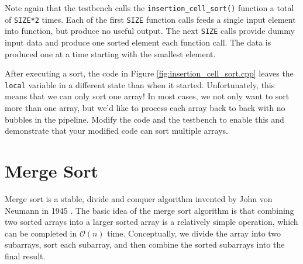 Note again that the testbench calls the \lstinline{insertion_cell_sort()} function a total of \lstinline{SIZE*2} times. Each of the first \lstinline{SIZE} function calls feeds a single input element into function, but produce no useful output. The next \lstinline{SIZE} calls provide dummy input data and produce one sorted element each function call.  The data is produced one at a time starting with the smallest element.

\begin{exercise}
After executing a sort, the code in Figure \ref{fig:insertion_cell_sort.cpp} leaves the \lstinline{local} variable in a different state than when it started.  Unfortunately, this means that we can only sort one array! In most cases, we not only want to sort more than one array, but we'd like to process each array back to back with no bubbles in the pipeline.   Modify the code and the testbench to enable this and demonstrate that your modified code can sort multiple arrays.
\end{exercise}

\section{Merge Sort}
\label{sec:sort:merge}
Merge sort is a stable, divide and conquer algorithm invented by John von Neumann in 1945 \cite{knuth1998art}. The basic idea of the merge sort algorithm is that combining two sorted arrays into a larger sorted array is a relatively simple operation, which can be completed in $\mathcal{O}(n)$ time.    Conceptually, we divide the array into two subarrays, sort each subarray, and then combine the sorted subarrays into the final result. 

